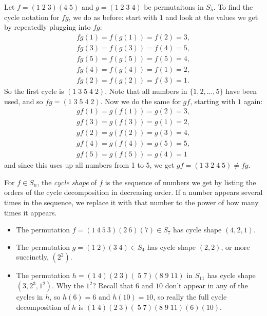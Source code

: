 \documentclass[11pt,dvipsnames]{book}
\numberwithin{figure}{section} %
\numberwithin{table}{section} %
\begin{document}
\begin{example}
Let $f=(1 \; 2 \; 3)(4 \; 5)$ and $g=(1 \; 2 \; 3 \; 4)$ be permutaitons in $S_{5}$. To find the cycle notation for $fg$, we do as before: start with $1$ and look at the values we get by repeatedly plugging into $fg$:
\begin{align*}
fg(1) = f(g(1)) = f(2) = 3, \\
fg(3) = f(g(3))=f(4)=5,\\
  fg(5) = f(g(5)) = f(5) = 4,\\
  fg(4) = f(g(4)) = f(1) = 2, \\
  fg(2) = f(g(2)) = f(3) = 1.
\end{align*}
So the first cycle is $(1 \; 3 \; 5 \; 4 \; 2)$. Note that all numbers in $\{1,2,...,5\}$ have been used, and so $fg = (1 \; 3 \; 5 \; 4 \; 2)$. Now we do the same for $gf$, starting with $1$ again:
\begin{align*}
gf(1) = g(f(1)) = g(2) = 3, \\  gf(3) = g(f(3)) = g(1) = 2,  \\ gf(2) = g(f(2)) = g(3) = 4,  \\ gf(4) = g(f(4)) = g(5) = 5,  \\ gf(5) =  g(f(5))  = g(4) = 1
\end{align*}
and since this uses up all numbers from 1 to 5, we get $gf = (1\; 3 \; 2 \; 4 \; 5)\neq fg$. 
\end{example}



For $f\in S_{n}$, the {\it cycle shape} of $f$ is the sequence of numbers we get by listing the orders of the cycle decomposition in decreasing order. If a number appears several times in the sequence, we replace it with that number to the power of how many times it appears.

\begin{example}
\begin{itemize}
\item 
The permutation $f=(1\ 4\ 5\ 3)(2\ 6)(7)\in S_{7}$ has cycle shape $(4,2,1)$. 
\item The permutation $g=(1 \; 2) (3 \; 4) \in S_{4}$ has cycle shape $(2,2)$, or more succinctly, $(2^2)$. 
\item The permutation $h = (1 \; 4)(2\; 3) (\;5 \; 7)(8 \; 9 \;11)$ in $S_{11}$ has cycle shape $(3,2^3,1^2)$. Why the $1^2$? Recall that $6$ and $10$ don't appear in any of the cycles in $h$, so $h(6)=6$ and $h(10)=10$, so really the full cycle decomposition of $h$ is $(1 \; 4)(2\; 3) (\;5 \; 7)(8 \; 9 \;11)(6)(10)$. 
\end{itemize}
\end{example}
\end{document}
